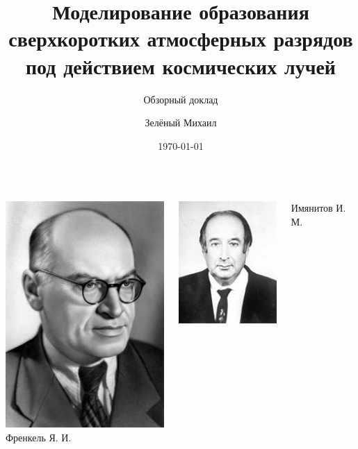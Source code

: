 \documentclass[10pt,pdf,hyperref={unicode}]{beamer}
\title{Моделирование образования сверхкоротких атмосферных разрядов под действием космических лучей}
\subtitle{Обзорный доклад}
\author{Зелёный Михаил}
\institute[ИЯИ]{Институт ядерных исследований РАН г. Троицк}
\date{\today}
\begin{document}
\begin{frame}
\titlepage
\end{frame} 


\begin{frame}
 	\begin{columns}
 		\begin{center}
 		\includegraphics[width=0.3\paperwidth]{image/fig04.jpg}\\
 		Френкель Я. И.
 		\end{center} 
 			
 		
 			\includegraphics[width=0.3\paperwidth]{image/fig05.jpg}\\
 			\begin{center}
 			Имянитов И. М.
            \end{center} 			 
 			
 	\end{columns}
\end{frame}
\end{document}
